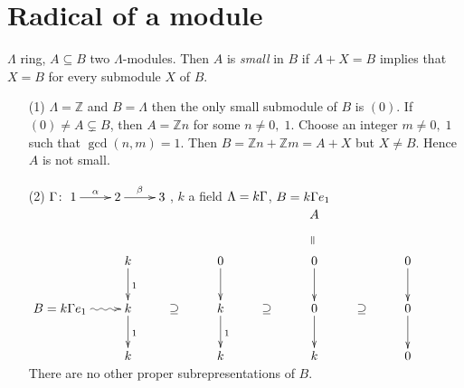 \section{Radical of a module}
\begin{defin}
$\Lambda$ ring, $A \subseteq B$ two $\Lambda$-modules. Then 
$A$ is \emph{small} in $B$ if $A+X=B$ implies
that $X=B$ for every submodule $X$ of $B$.  
\end{defin}

\begin{exam}
\begin{enumerate}
\item[(1)] $\Lambda=\mathbb{Z}$ and $B=\Lambda$ then the only small
  submodule of $B$ is $(0)$. If $(0)\neq A \subsetneq B$, then $A =
  \mathbb{Z}n$ for some $n \neq 0,\; 1$. Choose an integer $m \neq 0,
  \; 1$ such that $\gcd(n, m) = 1$. Then $B = \mathbb{Z}n +
  \mathbb{Z}m = A + X$ but $X \neq B$. Hence $A$ is not small. 

\item[(2)] $\G \colon \xymatrix{1\ar[r]^\alpha & 2\ar[r]^\beta & 3}$, $k$ a field $\Lambda = k\Gamma$, $B=k\Gamma e_1$\\
$\xymatrix{
							&					&			& && A\ar@{}[d]|-*[@]{=} &&\\
							& k \ar@{->}[d]^1 	&			&0\ar@{->}[d]&&0\ar@{->}[d]&&0\ar@{->}[d]\\
B = k\G e_1	\ar@{~>}[r] 	& k \ar@{->}[d]^1 	&\supseteq 	&k\ar@{->}[d]^1&\supseteq&0\ar@{->}[d]&\supseteq&0\ar@{->}[d]\\
						 	& k 				&			&k&&k&&0\\
}$\\
There are no other proper subrepresentations of $B$.


\end{enumerate}
\end{exam}
